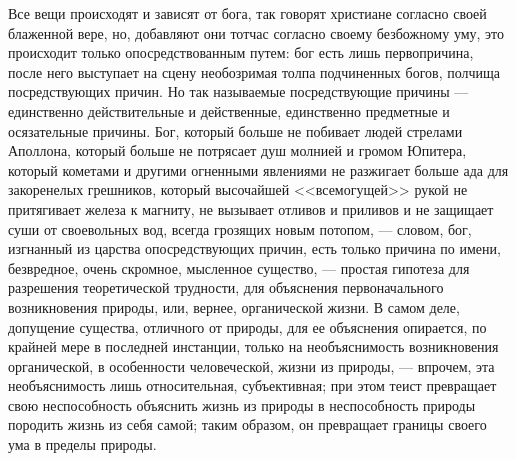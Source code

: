 \documentclass[12pt]{article}
\begin{document}
Все вещи происходят и зависят от бога, так говорят христиане согласно своей блаженной вере, но, добавляют они тотчас согласно своему безбожному уму, это происходит только опосредствованным путем: бог есть лишь первопричина, после него выступает на сцену необозримая толпа подчиненных богов, полчища посредствующих причин. Но так называемые посредствующие причины --- единственно действительные и действенные, единственно предметные и осязательные причины. Бог, который больше не побивает людей стрелами Аполлона, который больше не потрясает душ молнией и громом Юпитера, который кометами и другими огненными явлениями не разжигает больше ада для закоренелых грешников, который высочайшей <<всемогущей>> рукой не притягивает железа к магниту, не вызывает отливов и приливов и не защищает суши от своевольных вод, всегда грозящих новым потопом, --- словом, бог, изгнанный из царства опосредствующих причин, есть только причина по имени, безвредное, очень скромное, мысленное существо, --- простая гипотеза для разрешения теоретической трудности, для объяснения первоначального возникновения природы, или, вернее, органической жизни. В самом деле, допущение существа, отличного от природы, для ее объяснения опирается, по крайней мере в последней инстанции, только на необъяснимость возникновения органической, в особенности человеческой, жизни из природы, --- впрочем, эта необъяснимость лишь относительная, субъективная; при этом теист превращает свою неспособность объяснить жизнь из природы в неспособность природы породить жизнь из себя самой; таким образом, он превращает границы своего ума в пределы природы.



\section{}
\end{document}
